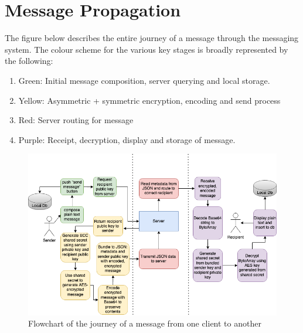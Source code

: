 \documentclass{mproj}
\begin{document}
\section{Message Propagation}
The figure below describes the entire journey of a message through the messaging system. The colour scheme for the various key stages is broadly represented by the following:
\begin{enumerate}
	\item Green: Initial message composition, server querying and local storage.
	\item Yellow: Asymmetric + symmetric encryption, encoding and send process
	\item Red: Server routing for message
	\item Purple: Receipt, decryption, display and storage of message.
\end{enumerate}

\begin{figure}[H]
\includegraphics[scale=0.5]{images/message-flow.png}
\caption{Flowchart of the journey of a message from one client to another}
\end{figure}
\end{document}
